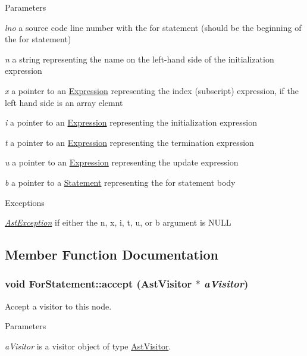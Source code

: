 \begin{DoxyParams}{Parameters}
\item[{\em lno}]a source code line number with the for statement (should be the beginning of the for statement) \item[{\em n}]a string representing the name on the left-\/hand side of the initialization expression \item[{\em x}]a pointer to an \hyperlink{classExpression}{Expression} representing the index (subscript) expression, if the left hand side is an array elemnt \item[{\em i}]a pointer to an \hyperlink{classExpression}{Expression} representing the initialization expression \item[{\em t}]a pointer to an \hyperlink{classExpression}{Expression} representing the termination expression \item[{\em u}]a pointer to an \hyperlink{classExpression}{Expression} representing the update expression \item[{\em b}]a pointer to a \hyperlink{classStatement}{Statement} representing the for statement body \end{DoxyParams}

\begin{DoxyExceptions}{Exceptions}
\item[{\em \hyperlink{classAstException}{AstException}}]if either the n, x, i, t, u, or b argument is NULL \end{DoxyExceptions}


\subsection{Member Function Documentation}
\hypertarget{classForStatement_a8d31a952806bc123a2f6227d4aa17f2f}{
\subsubsection[{accept}]{\setlength{\rightskip}{0pt plus 5cm}void ForStatement::accept ({\bf AstVisitor} $\ast$ {\em aVisitor})}}
\label{classForStatement_a8d31a952806bc123a2f6227d4aa17f2f}
Accept a visitor to this node. 
\begin{DoxyParams}{Parameters}
\item[{\em aVisitor}]is a visitor object of type \hyperlink{classAstVisitor}{AstVisitor}. \end{DoxyParams}


